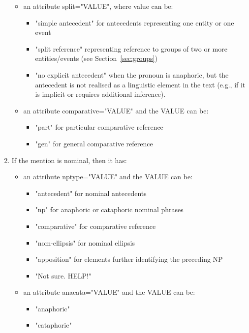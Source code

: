 \documentclass[a4paper]{article}
\begin{document}
\begin{enumerate}
\begin{itemize}
 \item an attribute split="VALUE", where value can be:
 \begin{itemize}
 \item "simple antecedent" for antecedents representing one entity or one event
 \item "split reference" representing reference to groups of two or more
 entities/events (see Section~\ref{sec:groups})
 \item "no explicit antecedent" when the pronoun is anaphoric, but the
 antecedent is not realised as a linguistic element in the text (e.g., if it is
 implicit or requires additional inference).
 \end{itemize}
 
 \item an attribute comparative="VALUE" and the VALUE can be:
  \begin{itemize}
 \item "part" for particular comparative reference
 \item "gen" for general comparative reference
 \end{itemize}

\end{itemize}

\item If the mention is nominal, then it has: 

\begin{itemize}

\item an attribute nptype="VALUE" and the VALUE can be:
\begin{itemize}
\item "antecedent" for nominal antecedents 
\item "np" for anaphoric or cataphoric nominal phrases
\item "comparative" for comparative reference
\item "nom-ellipsis" for nominal ellipsis
\item "apposition" for elements further identifying the preceding NP
\item "Not sure. HELP!"
\end{itemize}
  
 \item an attribute anacata="VALUE" and the VALUE can be:
  \begin{itemize}
 \item "anaphoric" 
 \item "cataphoric" 
 \end{itemize}
 

\end{itemize}
\end{enumerate}
\end{document}
